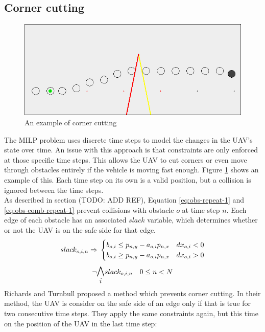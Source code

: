 \subsection{Corner cutting}
\begin{figure}
\includegraphics[width=\textwidth]{img/cornercut_bad}
\caption{An example of corner cutting}
\label{fig:cornercut-example}
\end{figure}
The MILP problem uses discrete time steps to model the changes in the UAV's state over time. An issue with this approach is that constraints are only enforced at those specific time steps. This allows the UAV to cut corners or even move through obstacles entirely if the vehicle is moving fast enough. Figure \ref{fig:cornercut-example} shows an example of this. Each time step on its own is a valid position, but a collision is ignored between the time steps.\\
As described in section (TODO: ADD REF), Equation \ref{eq:obs-repeat-1} and \ref{eq:obs-comb-repeat-1} prevent collisions with obstacle $o$ at time step $n$. Each edge of each obstacle has an associated $slack$ variable, which determines whether or not the UAV is on the safe side for that edge.
\begin{equation}
\label{eq:obs-repeat-1}
slack_{o,i,n} \Rightarrow \\
\begin{cases}
b_{o,i} \leq p_{n,y} - a_{o,i} p_{n,x} & dx_{o,i} < 0 \\
b_{o,i} \geq p_{n,y} - a_{o,i} p_{n,x} & dx_{o,i} > 0 \\
\end{cases}
\end{equation}
\begin{equation}
\label{eq:obs-comb-repeat-1}
\neg \mathlarger{\mathlarger{\bigwedge_{i}}} slack_{o,i,n} \quad 0 \leq n < N
\end{equation}
Richards and Turnbull\cite{Richards2015} proposed a method which prevents corner cutting. In their method, the UAV is consider on the safe side of an edge only if that is true for two consecutive time steps. They apply the same constraints again, but this time on the position of the UAV in the last time step:
